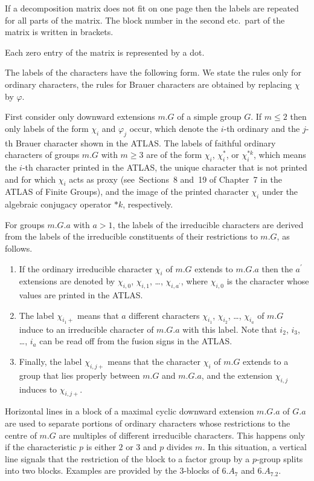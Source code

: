 \documentclass[a4paper]{article}
\def\ATLAS{\textsc{ATLAS}}
\begin{document}
If a decomposition matrix does not fit on one page then the labels are
repeated for all parts of the matrix.
The block number in the second etc.~part of the matrix is written in
brackets.

Each zero entry of the matrix is represented by a dot.

The labels of the characters have the following form.
We state the rules only for ordinary characters,
the rules for Brauer characters are obtained by replacing $\chi$
by $\varphi$.

First consider only downward extensions $m.G$ of a simple group $G$.
If $m \leq 2$ then only labels of the form $\chi_i$ and $\varphi_j$
occur,
which denote the $i$-th ordinary and the $j$-th Brauer character shown in
the {\ATLAS}.
The labels of faithful ordinary characters of groups $m.G$ with $m\geq 3$
are of the form $\chi_i$, $\chi_i^{\ast}$, or $\chi_i^{\ast k}$,
which means the $i$-th character printed in the {\ATLAS},
the unique character that is not printed and for which $\chi_i$ acts as
proxy
(see~Sections~8 and~19 of Chapter~7 in the {\ATLAS} of Finite Groups),
and the image of the printed character $\chi_i$ under the algebraic
conjugacy operator $\ast k$, respectively.

For groups $m.G.a$ with $a > 1$, the labels of the irreducible characters
are derived from the labels of the irreducible constituents of their
restrictions to $m.G$, as follows.
\begin{enumerate}
\item
    If the ordinary irreducible character $\chi_i$ of $m.G$ extends to
    $m.G.a$ then the $a^{\prime}$ extensions are denoted by
    $\chi_{i,0}$, $\chi_{i,1}$, \ldots, $\chi_{i,a^{\prime}}$,
    where $\chi_{i,0}$ is the character whose values are printed in the
    {\ATLAS}.
\item
    The label $\chi_{i_1+}$ means that $a$ different characters
    $\chi_{i_1}$, $\chi_{i_2}$, \ldots, $\chi_{i_a}$ of $m.G$ induce to
    an irreducible character of $m.G.a$ with this label.
    Note that $i_2$, $i_3$, \ldots, $i_a$ can be read off from the
    fusion signs in the {\ATLAS}.
\item
    Finally, the label $\chi_{i,j+}$ means that the character $\chi_i$
    of $m.G$ extends to a group that lies properly between $m.G$ and
    $m.G.a$, and the extension $\chi_{i,j}$ induces to $\chi_{i,j+}$.
\end{enumerate}

Horizontal lines in a block of a maximal cyclic downward extension
$m.G.a$ of $G.a$ are used to separate portions of ordinary characters
whose restrictions to the centre of $m.G$ are multiples of different
irreducible characters.
This happens only if the characteristic $p$ is either $2$ or $3$ and
$p$ divides $m$.
In this situation, a vertical line signals that the restriction of the
block to a factor group by a $p$-group splits into two blocks.
Examples are provided by the $3$-blocks of $6.A_7$ and $6.A_7.2$.
\end{document}
